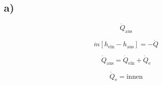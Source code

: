 

\subsection*{a)}

\[
\dot{Q}_{\text{aus}}
\]

\[
\dot{m} \left[ h_{\text{ein}} - h_{\text{aus}} \right] = -\dot{Q}
\]

\[
\dot{Q}_{\text{aus}} = \dot{Q}_{\text{ein}} + \dot{Q}_{\text{e}}
\]

\[
\dot{Q}_{\text{e}} = \text{innen}
\]